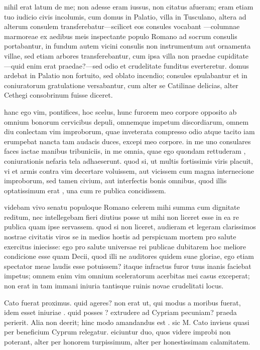  nihil erat latum de me; non adesse eram iussus, non citatus afueram; eram etiam tuo iudicio civis incolumis, cum domus in Palatio, villa in Tusculano, altera ad alterum consulem transferebatur—scilicet eos consules vocabant —columnae marmoreae ex aedibus meis inspectante populo Romano ad socrum consulis portabantur, in fundum autem vicini consulis non instrumentum aut ornamenta villae, sed etiam arbores transferebantur, cum ipsa villa non praedae cupiditate —quid enim erat praedae?—sed odio et crudelitate funditus everteretur. domus ardebat in Palatio non fortuito, sed oblato incendio; consules epulabantur et in coniuratorum gratulatione versabantur, cum alter se Catilinae delicias, alter Cethegi consobrinum fuisse diceret.

 hanc ego vim, pontifices, hoc scelus, hunc furorem meo corpore opposito ab omnium bonorum cervicibus depuli, omnemque impetum discordiarum, omnem diu conlectam vim improborum, quae inveterata compresso odio atque tacito iam erumpebat nancta tam audacis duces, excepi meo corpore. in me uno consulares faces iactae manibus tribuniciis, in me omnia, quae ego quondam rettuderam , coniurationis nefaria tela adhaeserunt. quod si, ut multis fortissimis viris placuit, vi et armis contra vim decertare voluissem, aut vicissem cum magna internecione improborum, sed tamen civium, aut interfectis bonis omnibus, quod illis optatissimum erat , una cum re publica concidissem.

 videbam vivo senatu populoque Romano celerem mihi summa cum dignitate reditum, nec intellegebam fieri diutius posse ut mihi non liceret esse in ea re publica quam ipse servassem. quod si non liceret, audieram et legeram clarissimos nostrae civitatis viros se in medios hostis ad perspicuam mortem pro salute exercitus iniecisse: ego pro salute universae rei publicae dubitarem hoc meliore condicione esse quam Decii, quod illi ne auditores quidem suae gloriae, ego etiam spectator meae laudis esse potuissem? itaque infractus furor tuus inanis faciebat impetus; omnem enim vim omnium sceleratorum acerbitas mei casus exceperat; non erat in tam immani iniuria tantisque ruinis novae crudelitati locus.

 Cato fuerat proximus. quid ageres? non erat ut, qui modus a moribus fuerat, idem esset iniuriae . quid posses ? extrudere ad Cypriam pecuniam? praeda perierit. Alia non deerit; hinc modo amandandus est . sic M. Cato invisus quasi per beneficium Cyprum relegatur. eiciuntur duo, quos videre improbi non poterant, alter per honorem turpissimum, alter per honestissimam calamitatem.


